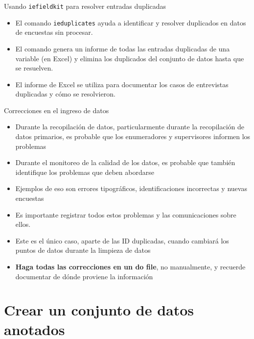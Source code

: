 \documentclass[10pt, aspectratio=169, compress]{beamer}
\begin{document}
\begin{frame}[t]{Usando \texttt{iefieldkit} para resolver entradas duplicadas}
	\begin{itemize}
		\item El comando \texttt{ieduplicates} ayuda a identificar y resolver duplicados en datos de encuestas sin procesar.
		\item El comando genera un informe de todas las entradas duplicadas de una variable (en Excel) y elimina los duplicados del conjunto de datos hasta que se resuelven.
		\item El informe de Excel se utiliza para documentar los casos de entrevistas duplicadas y cómo se resolvieron.
	\end{itemize}
\end{frame}
\begin{frame}[t]{Correcciones en el ingreso de datos}	
	\begin{itemize}
		\item Durante la recopilación de datos, particularmente durante la recopilación de datos primarios, es probable que los enumeradores y supervisores informen los problemas
		\item Durante el monitoreo de la calidad de los datos, es probable que también identifique los problemas que deben abordarse
		\item Ejemplos de eso son errores tipográficos, identificaciones incorrectas y nuevas encuestas
		\item Es importante registrar todos estos problemas y las comunicaciones sobre ellos.
		\item Este es el único caso, aparte de las ID duplicadas, cuando cambiará los puntos de datos durante la limpieza de datos
		\item \textbf{Haga todas las correcciones en un do file}, no manualmente, y recuerde documentar de dónde proviene la información
	\end{itemize}
\end{frame}
\section{Crear un conjunto de datos anotados}
\end{document}
